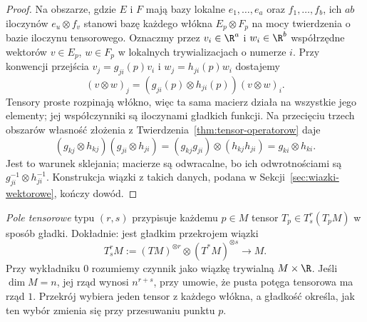\begin{proof}
Na obszarze, gdzie $E$ i $F$ mają bazy lokalne
$e_1,\ldots,e_a$ oraz $f_1,\ldots,f_b$, ich $ab$
iloczynów $e_u\otimes f_v$ stanowi bazę każdego włókna
$E_p\otimes F_p$ na mocy twierdzenia o bazie iloczynu
tensorowego. Oznaczmy przez $v_i\in\R^a$ i $w_i\in\R^b$
współrzędne wektorów $v\in E_p$, $w\in F_p$ w lokalnych
trywializacjach o numerze $i$. Przy konwencji przejścia
$v_j=g_{ji}(p)v_i$ i $w_j=h_{ji}(p)w_i$ dostajemy
\[
 (v\otimes w)_j=(g_{ji}(p)\otimes h_{ji}(p))(v\otimes w)_i.
\]
Tensory proste rozpinają włókno, więc ta sama macierz działa
na wszystkie jego elementy; jej współczynniki są iloczynami
gładkich funkcji. Na przecięciu
trzech obszarów własność złożenia z
Twierdzenia~\ref{thm:tensor-operatorow} daje
\[
 (g_{kj}\otimes h_{kj})(g_{ji}\otimes h_{ji})
   =(g_{kj}g_{ji})\otimes(h_{kj}h_{ji})
   =g_{ki}\otimes h_{ki}.
\]
Jest to warunek sklejania; macierze są odwracalne,
bo ich odwrotnościami są $g_{ji}^{-1}\otimes h_{ji}^{-1}$.
Konstrukcja wiązki z takich danych, podana w
Sekcji~\ref{sec:wiazki-wektorowe}, kończy dowód.
\end{proof}

\begin{definicja}
\label{def:pole-tensorowe}
\emph{Pole tensorowe} typu $(r,s)$ przypisuje każdemu
$p\in M$ tensor $T_p\in T^r_s(T_pM)$ w sposób gładki.
Dokładnie: jest gładkim przekrojem wiązki
\begin{equation}\label{eq:wiazka-tensorowa}
 T^r_s M:=(TM)^{\otimes r}\otimes(T^*M)^{\otimes s}
 \longrightarrow M.
\end{equation}
Przy wykładniku $0$ rozumiemy czynnik jako wiązkę
trywialną $M\times\R$.
Jeśli $\dim M=n$, jej rząd wynosi $n^{r+s}$, przy umowie,
że pusta potęga tensorowa ma rząd $1$. Przekrój wybiera
jeden tensor z każdego włókna, a gładkość określa, jak
ten wybór zmienia się przy przesuwaniu punktu $p$.
\end{definicja}

